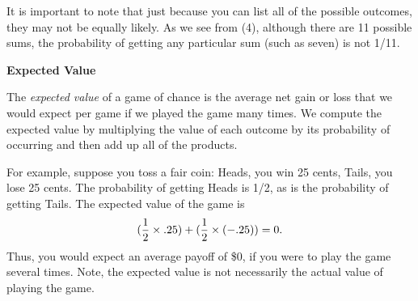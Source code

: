 It is important to note that just because you can list all of the possible outcomes, they may not be equally likely. As we see from (4), although there are 11 possible sums, the probability of getting any particular sum (such as seven) is not 1/11. 

\vspace{.2in}
\noindent
{\bf Expected Value}
\vspace{.1in}

The {\it expected value} of a game of chance is the average net gain or loss that we would expect per game if we played the game many times. We compute the expected value by multiplying the value of each outcome by its probability of occurring and then add up all of the products.

For example, suppose you toss a fair coin: Heads, you win 25 cents, Tails, you lose 25 cents. The probability of getting Heads is 1/2, as is the probability of getting Tails. The expected value of the game is
\[({1\over 2}\times .25)+({1\over 2}\times(- .25))=0.\]
Thus, you would expect an average payoff of \$0, if you were to play the game several times. Note, the expected value is not necessarily the actual value of playing the game.

\vspace{.1in}

